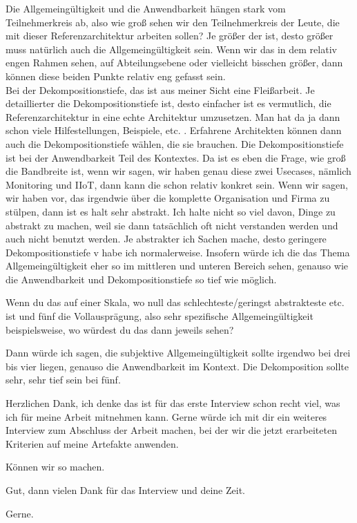 \PA	 Die Allgemeingültigkeit und die Anwendbarkeit hängen stark vom Teilnehmerkreis ab, also wie groß sehen wir den Teilnehmerkreis der Leute, die mit dieser Referenzarchitektur arbeiten sollen? Je größer der ist, desto größer muss natürlich auch die Allgemeingültigkeit sein. Wenn wir das in dem relativ engen Rahmen sehen, auf Abteilungsebene oder vielleicht bisschen größer, dann können diese beiden Punkte relativ eng gefasst sein. \\
Bei der Dekompositionstiefe, das ist aus meiner Sicht eine Fleißarbeit. Je detaillierter die Dekompositionstiefe ist, desto einfacher ist es vermutlich, die Referenzarchitektur in eine echte Architektur umzusetzen. Man hat da ja dann schon viele Hilfestellungen, Beispiele, etc. . Erfahrene Architekten können dann auch die Dekompositionstiefe wählen, die sie brauchen. Die Dekompositionstiefe ist bei der Anwendbarkeit Teil des Kontextes. Da ist es eben die Frage, wie groß die Bandbreite ist, wenn wir sagen, wir haben genau diese zwei Usecases, nämlich Monitoring und \ac{IIoT}, dann kann die schon relativ konkret sein. Wenn wir sagen, wir haben vor, das irgendwie über die komplette Organisation und Firma zu stülpen, dann ist es halt sehr abstrakt. Ich halte nicht so viel davon, Dinge zu abstrakt zu machen, weil sie dann tatsächlich oft nicht verstanden werden und auch nicht benutzt werden. Je abstrakter ich Sachen mache, desto geringere Dekompositionstiefe v habe ich normalerweise. Insofern würde ich die das Thema Allgemeingültigkeit eher so im mittleren und unteren Bereich sehen, genauso wie die Anwendbarkeit und Dekompositionstiefe so tief wie möglich.

\LF	Wenn du das auf einer Skala, wo null das schlechteste/geringst abstrakteste etc. ist und fünf die Vollausprägung, also sehr spezifische Allgemeingültigkeit beispielsweise, wo würdest du das dann jeweils sehen?

\PA	 Dann würde ich sagen, die subjektive Allgemeingültigkeit sollte irgendwo bei drei bis vier liegen, genauso die Anwendbarkeit im Kontext. Die Dekomposition sollte sehr, sehr tief sein bei fünf.

\LF	 Herzlichen Dank, ich denke das ist für das erste Interview schon recht viel, was ich für meine Arbeit mitnehmen kann. Gerne würde ich mit dir ein weiteres Interview zum Abschluss der Arbeit machen, bei der wir die jetzt erarbeiteten Kriterien auf meine Artefakte anwenden.

\PA	 Können wir so machen.

\LF	Gut, dann vielen Dank für das Interview und deine Zeit.

\PA	 Gerne.